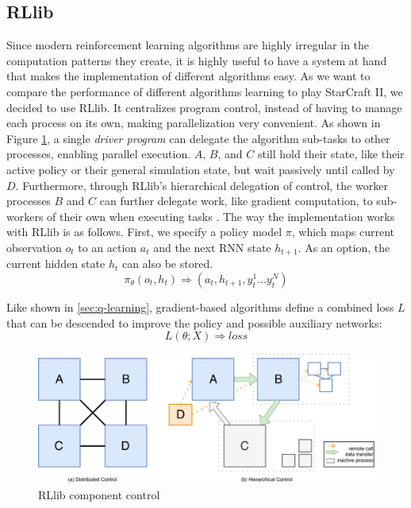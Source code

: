 \documentclass[12pt,a4paper]{article}
\begin{document}
\subsection{RLlib}
Since modern reinforcement learning algorithms are highly irregular in the computation patterns they create, it is highly useful to have a system at hand that makes the implementation of different algorithms easy. As we want to compare the performance of different algorithms learning to play StarCraft II, we decided to use RLlib. It centralizes program control, instead of having to manage each process on its own, making parallelization very convenient. As shown in Figure \ref{fig:DRL_control_model}, a single {\it driver program} can delegate the algorithm sub-tasks to other processes, enabling parallel execution. $A$, $B$, and $C$ still hold their state, like their active policy or their general simulation state, but wait passively until called by $D$.  Furthermore, through RLlib's hierarchical delegation of control, the worker processes $B$ and $C$ can further delegate work, like gradient computation, to sub-workers of their own when executing tasks \cite{Liang2017}.
The way the implementation works with RLlib is as follows. First, we specify a policy model $\pi$, which maps current observation $o_t$  to an action $a_t$ and the next RNN state $h_{t+1}$. As an option, the current hidden state $h_t$ can also be stored.
\begin{equation}
    \label{eq:policy_graph}
    \pi_\theta(o_t, h_t) \Rightarrow (a_t,h_{t+1}, y_t^1 ... y_t^N)
\end{equation}

Like shown in \ref{sec:q-learning}, gradient-based algorithms define a combined loss $L$ that can be descended to improve the policy and possible auxiliary networks:
\begin{equation}
    \label{eq:combined_loss}
    L(\theta; X) \Rightarrow loss
\end{equation}

\begin{figure}
    \centering
    \includegraphics[width=\linewidth]{Figures/DRL_Control_Model.pdf}
    \caption{RLlib component control \cite{Liang2017}}
    \label{fig:DRL_control_model}
\end{figure}
\end{document}
